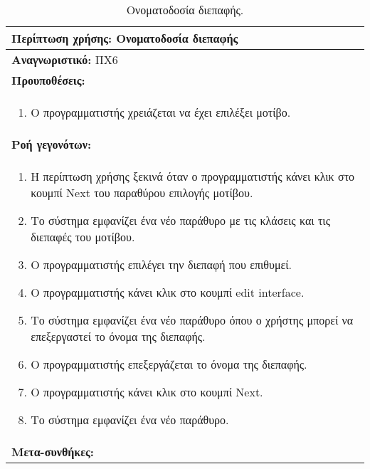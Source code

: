\begin{table}[H]
	\hspace*{-0.2cm}
    \centering
    \scriptsize
	\begin{tabular}{|p{10cm}|}
	\hline
		\textbf{Περίπτωση χρήσης:} Ονοματοδοσία διεπαφής  \\
	\hline
		\textbf{Αναγνωριστικό:} ΠΧ6 \\
	\hline	
		\textbf{Προυποθέσεις:} \\
		\begin{enumerate}
		 \item Ο προγραμματιστής χρειάζεται να έχει επιλέξει μοτίβο.
		\end{enumerate} \\
	\hline
		\textbf{Ροή γεγονότων:} \\
		\begin{enumerate}
			\item Η περίπτωση χρήσης ξεκινά όταν ο προγραμματιστής κάνει κλικ στο κουμπί Next του παραθύρου επιλογής μοτίβου.
			\item Το σύστημα εμφανίζει ένα νέο παράθυρο με τις κλάσεις και τις διεπαφές του μοτίβου.
			\item Ο προγραμματιστής επιλέγει την διεπαφή που επιθυμεί.
			\item Ο προγραμματιστής κάνει κλικ στο κουμπί edit interface.
			 \item Το σύστημα εμφανίζει ένα νέο παράθυρο όπου ο χρήστης μπορεί να επεξεργαστεί το όνομα της διεπαφής.
			 \item Ο προγραμματιστής επεξεργάζεται το όνομα της διεπαφής.
			 \item Ο προγραμματιστής κάνει κλικ στο κουμπί Next.
			 \item Το σύστημα εμφανίζει ένα νέο παράθυρο.
		\end{enumerate} \\
	\hline
		\textbf{Μετα-συνθήκες:} \\
	\hline
    \end{tabular}
    \caption{Ονοματοδοσία διεπαφής.}
    \label{tab:nameInterfaceUC}
\end{table}
